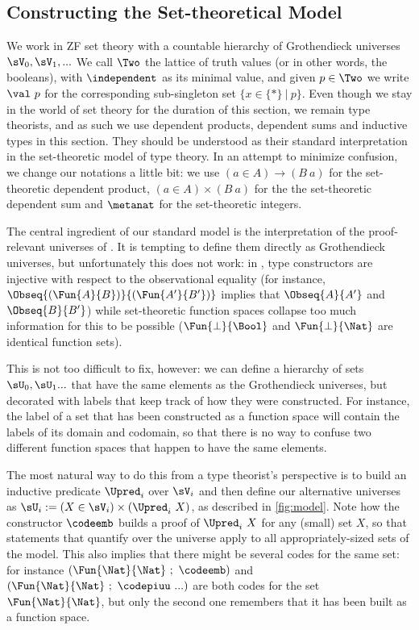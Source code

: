 \subsection{Constructing the Set-theoretical Model}

We work in ZF set theory with a countable hierarchy of Grothendieck universes
\( \sV_0, \sV_1, ... \)
%
We call \( \Two \) the lattice of truth values (or in other words, the
booleans), with \( \independent \) as its minimal value,
and given \( p \in \Two \) we write \( \val\ p \) for the
corresponding sub-singleton set \( \{ x \in \{ * \}\ |\ p \} \).
%
Even though we stay in the world of set theory for the duration of
this section, we remain type theorists, and as such
we use dependent products, dependent sums and inductive types in this
section. They should be understood as their standard interpretation in
the set-theoretic model of type theory.
%
In an attempt to minimize confusion, we change our notations a little
bit: we use \( (a \in A) \to (B\ a) \) for the set-theoretic dependent product,
\( (a \in A) \times (B\ a) \) for the the set-theoretic dependent sum and
\( \metanat \) for the set-theoretic integers.

The central ingredient of our standard model is the interpretation of the
proof-relevant universes of \SetoidCC.
%
It is tempting to define them directly as Grothendieck universes, but 
unfortunately this does not work: in \SetoidCC, type constructors are 
injective with respect to the observational equality
(for instance, \( \Obseq{(\Fun{A}{B})}{(\Fun{A'}{B'})} \) implies that
\( \Obseq{A}{A'} \) and \( \Obseq{B}{B'} \)) while set-theoretic function
spaces collapse too much information for this to be possible
(\( \Fun{\bot}{\Bool} \) and \( \Fun{\bot}{\Nat} \) are identical function 
sets).

This is not too difficult to fix, however: 
% 
we can define a hierarchy of sets \( \sU_0 , \sU_1 ... \) that have the same 
elements as the Grothendieck universes, but decorated with labels that keep 
track of how they were constructed. For instance, the label of a set that has 
been constructed as a function space will contain the labels of its domain and 
codomain, so that there is no way to confuse two different function spaces that happen
to have the same elements. 

The most natural way to do this from a type
theorist's perspective is to build an inductive predicate \( \Upred_i \) over
\( \sV_i \) and then define our alternative universes as
\( \sU_i := (X \in \sV_i)\times(\Upred_i\ X) \), as described in \cref{fig:model}.
%
Note how the constructor \( \codeemb \) builds a proof of \( \Upred_i\ X \)
for any (small) set \( X \), so that \SetoidCC statements that quantify over
the universe apply to all appropriately-sized sets of the model.
%
This also implies that there might be several codes for the
same set: for instance \( (\Fun{\Nat}{\Nat} \ ;\ \codeemb) \) and
\( (\Fun{\Nat}{\Nat} \ ;\ \codepiuu\ ...) \) are both codes for
the set \( \Fun{\Nat}{\Nat} \), but only the second one remembers that it
has been built as a function space.

